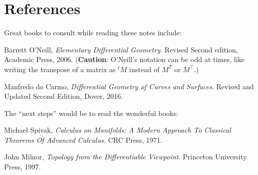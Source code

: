 \section{References}

Great books to consult while reading these notes include:
\begin{enumerate}[label={[\arabic*]}]
\item Barrett O'Neill, \emph{Elementary Differential Geometry}.
Revised Second edition, Academic Press, 2006. (\textbf{Caution}: O'Neill's
notation can be odd at times, like writing the transpose of a matrix as
${}^{t}\!M$ instead of $M^{T}$ or $M^{\top}$.)
\item Manfredo do Carmo,
  \emph{Differential Geometry of Curves and Surfaces}.
  Revised and Updated Second Edition, Dover, 2016.
\end{enumerate}

\bigskip
\noindent%
The ``next steps'' would be to read the wonderful books:
\begin{enumerate}[resume,label={[\arabic*]}]
\item Michael Spivak, \emph{Calculus on Manifolds: A Modern Approach To Classical Theorems Of Advanced Calculus}.
  CRC Press, 1971.
\item John Milnor, \emph{Topology from the Differentiable Viewpoint}.
  Princeton University Press, 1997.
\end{enumerate}